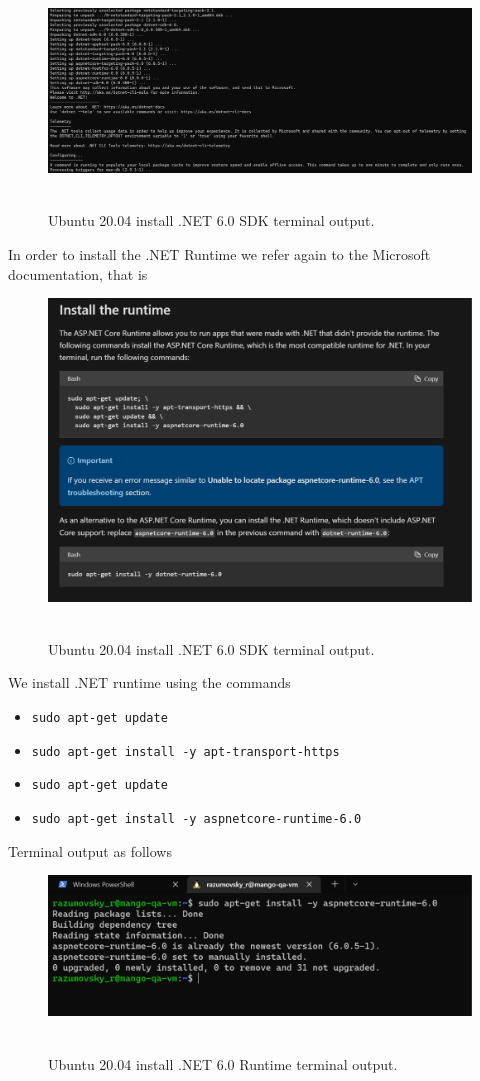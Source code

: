 \begin{figure}[H]
    \centering
    \includegraphics[width=1\textwidth]{img/03_4_sdk_install_3}
    ~\caption{Ubuntu 20.04 install .NET 6.0 SDK terminal output.}\label{fig:figure6}
\end{figure}

In order to install the .NET Runtime we refer again to the Microsoft documentation, that is
\begin{figure}[H]
    \centering
    \includegraphics[width=1\textwidth]{img/03_2_runtime_documentation}
    ~\caption{Ubuntu 20.04 install .NET 6.0 SDK terminal output.}\label{fig:figure7}
\end{figure}
We install .NET runtime using the commands
\begin{itemize}
    \item \texttt{sudo apt-get update}
    \item \texttt{sudo apt-get install -y apt-transport-https}
    \item \texttt{sudo apt-get update}
    \item \texttt{sudo apt-get install -y aspnetcore-runtime-6.0}
\end{itemize}
Terminal output as follows
\begin{figure}[H]
    \centering
    \includegraphics[width=1\textwidth]{img/03_6_runtime_install}
    ~\caption{Ubuntu 20.04 install .NET 6.0 Runtime terminal output.}\label{fig:figure8}
\end{figure}

